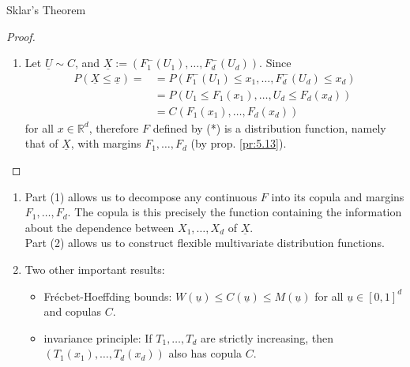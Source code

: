 \documentclass{article}
\newcommand{\R}{\mathbb{R}}
\begin{document}
\begin{mythm}{Sklar's Theorem}{}
\begin{proof}
\begin{enumerate}
				\item Let $\underline{U}\sim C$, and $\underline{X}:=(F_1^-(U_1), \dots, F_d^-(U_d))$. Since
				\begin{align*}
					P(\underline{X}\leq\underline{x})=&=P(F_1^-(U_1)\leq x_1, \dots, F_d^-(U_d)\leq x_d)\\
					&=P(U_1\leq F_1(x_1), \dots, U_d\leq F_d(x_d))\\
					&=C(F_1(x_1), \dots, F_d(x_d))
				\end{align*}
				for all $x\in\R^d$, therefore $F$ defined by (*) is a distribution function, namely that of $\underline{X}$, with margins $F_1, \dots, F_d$ (by prop. \ref{pr:5.13}).
			\end{enumerate}
		\end{proof}
	\end{mythm}
	
	\begin{myrem}{}{}
		\begin{enumerate}
			\item Part (1) allows us to decompose any continuous $F$ into its copula and margins $F_1, \dots, F_d$. The copula is this precisely the function containing the information about the dependence between $X_1, \dots, X_d$ of $\underline{X}$.\\
			
			Part (2) allows us to construct flexible multivariate distribution functions.
			
			\item Two other important results:
			\begin{itemize}
				\item Fr\' ecbet-Hoeffding bounds: $W(\underline{u})\leq C(\underline{u})\leq M(\underline{u})$ for all $\underline{u}\in[0, 1]^d$ and copulas $C$.
				
				\item invariance principle: If $T_1, \dots, T_d$ are strictly increasing, then $(T_1(x_1), \dots, T_d(x_d))$ also has copula $C$.
			\end{itemize}
		\end{enumerate}
	\end{myrem}
	
\end{document}
